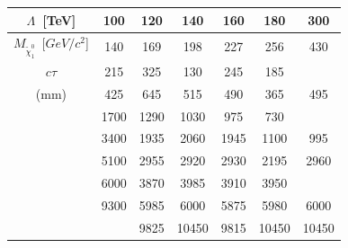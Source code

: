 \documentclass{beamer}
\begin{document}
\begin{frame}
\begin{minipage}[b]{0.7\paperwidth}
\begin{itemize}
{%
\begin{tabular}{c c c c c c c}
\hline \hline
$\Lambda$~[TeV] & 100  &   120  &  140  &  160  &  180  &  300  \\
\hline
$M_{\tilde{\chi}^{0}_{1}}$~[$GeV/c^{2}$] & 140 &   169  &  198  &  227  &  256  &  430  \\
\hline
$c\tau$         &  215   &   325  &   130 &   245 &   185 &       \\
 (mm)     &  425   &   645  &   515 &   490 &   365 &   495 \\
                 &  1700  &  1290  &  1030 &   975 &   730 &       \\
                 &  3400  &  1935  &  2060 &  1945 &  1100 &   995 \\
                 &  5100  &  2955  &  2920 &  2930 &  2195 &  2960 \\
                 &  6000  &  3870  &  3985 &  3910 &  3950 &       \\
                 &  9300  &  5985  &  6000 &  5875 &  5980 &  6000 \\
                 &        &  9825  & 10450 &  9815 & 10450 & 10450 \\
\hline \hline
    \end{tabular}
    
}
        
    \end{itemize} 

\end{minipage} 
 

\end{frame}
\end{document}
